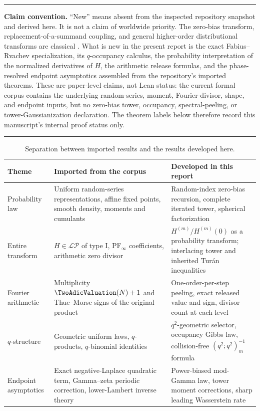 \documentclass[11pt,oneside]{article}
\theoremstyle{definition}
\theoremstyle{remark}
\newcommand{\LP}{\mathcal{LP}}
\newenvironment{statusbox}{%
  \par\smallskip\noindent\begin{center}\begin{minipage}{0.94\textwidth}%
  \hrule\vspace{0.6em}\small
}{%
  \vspace{0.6em}\hrule\end{minipage}\end{center}\smallskip
}
\begin{document}
\begin{statusbox}
\textbf{Claim convention.}  ``New'' means absent from the inspected repository
snapshot and derived here.  It is not a claim of worldwide priority.  The
zero-bias transform, replacement-of-a-summand coupling, and general
higher-order distributional transforms are classical
\cite{goldsteinreinert1997,goldsteinreinert2005,dobler2015}.  What is new in the
present report is the exact Fabius--Rvachev specialization, its $q$-occupancy
calculus, the probability interpretation of the normalized derivatives of
$H$, the arithmetic release formulas, and the phase-resolved endpoint
asymptotics assembled from the repository's imported theorems.  These are
paper-level claims, not Lean status: the current formal corpus contains the
underlying random-series, moment, Fourier-divisor, shape, and endpoint inputs,
but no zero-bias tower, occupancy, spectral-peeling, or tower-Gaussianization
declaration.  The theorem labels below therefore record this manuscript's
internal proof status only.
\end{statusbox}

\begin{table}[ht]
\centering
\caption{Separation between imported results and the results developed here.}
\label{tab:status}
\small
\begin{tabularx}{\textwidth}{@{}p{}X X@{}}
\toprule
Theme & Imported from the corpus & Developed in this report \\
\midrule
Probability law
& Uniform random-series representations, affine fixed points, smooth density,
  moments and cumulants
& Random-index zero-bias recursion, complete iterated tower, spherical
  factorization \\
Entire transform
& $H\in\LP$ of type I, PF$_\infty$ coefficients, arithmetic zero divisor
& $H^{(m)}/H^{(m)}(0)$ as a probability transform; interlacing tower and
  inherited Tur\'an inequalities \\
Fourier arithmetic
& Multiplicity $\TwoAdicValuation(N)+1$ and Thue--Morse signs of the original product
& One-order-per-step peeling, exact released value and sign, divisor count at
  each level \\
$q$-structure
& Geometric uniform laws, $q$-products, $q$-binomial identities
& $q^2$-geometric selector, occupancy Gibbs law, collision-free
  $(q^2;q^2)_m^{-1}$ formula \\
Endpoint asymptotics
& Exact negative-Laplace quadratic term, Gamma--zeta periodic correction,
  lower-Lambert inverse theory
& Power-biased mod-Gamma law, tower moment corrections, sharp leading
  Wasserstein rate \\
\bottomrule
\end{tabularx}
\end{table}
\end{document}
